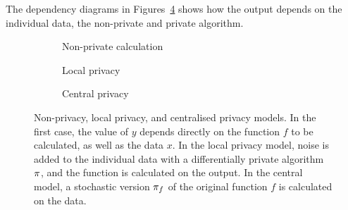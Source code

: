\begin{frame}
{    The dependency diagrams in Figures~\ref{fig:privacy-diagrams} shows
    how the output depends on the individual data, the non-private and
    private algorithm. 

  }
  
  \begin{figure}[H]
    \begin{subfigure}{0.3\textwidth}
      \centering
      \caption{Non-private calculation}
      \label{fig:non-private}
    \end{subfigure}
    \begin{subfigure}{0.3\textwidth}
      \centering
      \caption{Local privacy}
      \label{fig:local-privacy}
    \end{subfigure}
    \begin{subfigure}{0.3\textwidth}
      \centering
      \caption{Central privacy}
      \label{fig:central-privacy}
    \end{subfigure}
    \caption{Non-privacy, local privacy, and centralised privacy models. In the first case, the value of $y$ depends directly on the function $f$ to be calculated, as well as the data $x$. In the local privacy model, noise is added to the individual data with a differentially private algorithm $\pi$, and the function is calculated on the output. In the central model, a stochastic version $\pi_f$ of the original function $f$ is calculated on the data.}
    \label{fig:privacy-diagrams}
  \end{figure}


\end{frame}
